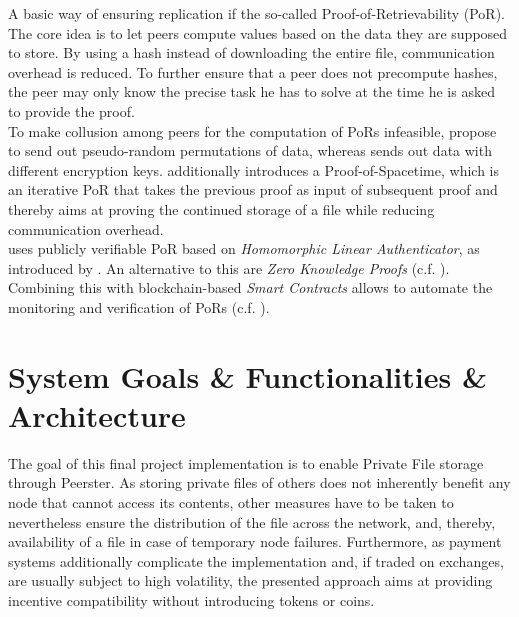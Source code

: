 \documentclass{article}
\begin{document}
A basic way of ensuring replication if the so-called Proof-of-Retrievability (PoR). The core idea is to let peers compute values based on the data they are supposed to store. By using a hash instead of downloading the entire file, communication overhead is reduced. To further ensure that a peer does not precompute hashes, the peer may only know the precise task he has to solve at the time he is asked to provide the proof.
\\
To make collusion among peers for the computation of PoRs infeasible, \cite{ProtocolLabs.2017} propose to send out pseudo-random permutations of data, whereas \cite{Vorick.2014} sends out data with different encryption keys. 
\cite{ProtocolLabs.2017} additionally introduces a Proof-of-Spacetime, which is an iterative PoR that takes the previous proof as input of subsequent proof and thereby aims at proving the continued storage of a file while reducing communication overhead.
\\
\cite{Kopp.2017} uses publicly verifiable PoR based on \emph{Homomorphic Linear Authenticator}, as introduced by \cite{Ateniese.2009}. An alternative to this are \emph{Zero Knowledge Proofs} (c.f. \cite{Lambert.2015}).
\\
Combining this with blockchain-based \emph{Smart Contracts} allows to automate the monitoring and verification of PoRs (c.f. \cite{Vorick.2014}). 


\section*{System Goals \& Functionalities \& Architecture} 
The goal of this final project implementation is to enable Private File storage through Peerster. As storing private files of others does not inherently benefit any node that cannot access its contents, other measures have to be taken to nevertheless ensure the distribution of the file across the network, and, thereby, availability of a file in case of temporary node failures. Furthermore, as payment systems additionally complicate the implementation and, if traded on exchanges, are usually subject to high volatility, the presented approach aims at providing incentive compatibility without introducing tokens or coins. 
\\\vspace{0.5em}
\end{document}
